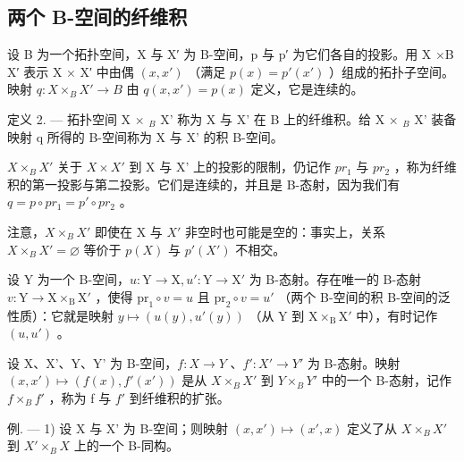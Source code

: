 \subsection{两个 B-空间的纤维积}

设 B 为一个拓扑空间，X 与 X′ 为 B-空间，p 与 p′ 为它们各自的投影。用 X ×B X′ 表示 X × X′ 中由偶 \((x, x')\) （满足 \(p(x) = p'(x')\) ）组成的拓扑子空间。映射 \(q: X \times_{B} X' \to B\) 由 \(q(x, x') = p(x)\) 定义，它是连续的。

定义 2. --- 拓扑空间 X × \(_{B}\) X' 称为 X 与 X' 在 B 上的纤维积。给 X × \(_{B}\) X' 装备映射 q 所得的 B-空间称为 X 与 X' 的积 B-空间。

\(X \times_{B} X'\) 关于 \(X \times X'\) 到 X 与 X' 上的投影的限制，仍记作 \(pr_{1}\) 与 \(pr_{2}\) ，称为纤维积的第一投影与第二投影。它们是连续的，并且是 B-态射，因为我们有 \(q = p \circ pr_{1} = p' \circ pr_{2}\) 。

注意，\(X \times_{B} X'\) 即使在 X 与 \(X'\) 非空时也可能是空的：事实上，关系 \(X \times_{B} X' = \varnothing\) 等价于 \(p(X)\) 与 \(p'(X')\) 不相交。

设 Y 为一个 B-空间，\(u\colon\mathrm{Y}\to\mathrm{X}, u'\colon\mathrm{Y}\to\mathrm{X}'\) 为 B-态射。存在唯一的 B-态射 \(v\colon\mathrm{Y}\to\mathrm{X}\times_{\mathrm{B}}\mathrm{X}'\) ，使得 \(\mathrm{pr}_{1}\circ v=u\) 且 \(\mathrm{pr}_{2}\circ v=u'\) （两个 B-空间的积 B-空间的泛性质）：它就是映射 \(y\mapsto(u(y),u'(y))\) （从 Y 到 \(\mathrm{X}\times_{\mathrm{B}}\mathrm{X}'\) 中），有时记作 \((u,u')\) 。

设 X、X'、Y、Y' 为 B-空间，\(f: X \to Y\) 、\(f': X' \to Y'\) 为 B-态射。映射 \((x, x') \mapsto (f(x), f'(x'))\) 是从 \(X \times_{B} X'\) 到 \(Y \times_{B} Y'\) 中的一个 B-态射，记作 \(f \times_{B} f'\) ，称为 f 与 \(f'\) 到纤维积的扩张。

例. --- 1) 设 X 与 X' 为 B-空间；则映射 \((x, x') \mapsto (x', x)\) 定义了从 \(X \times_{B} X'\) 到 \(X' \times_{B} X\) 上的一个 B-同构。

